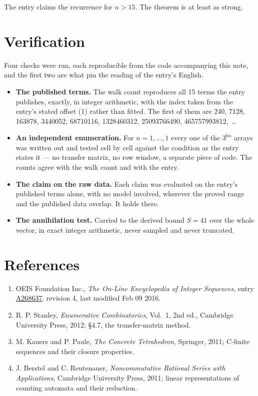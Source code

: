 \documentclass[11pt]{article}
\theoremstyle{definition}
\begin{document}
The entry claims the recurrence for $n > 15$. The theorem is at least as strong.

\section{Verification}

Four checks were run, each reproducible from the code accompanying this note, and the first two are what pin the reading of the entry's English.

\begin{itemize}

\item {\bfseries The published terms.} The walk count reproduces all 15 terms the entry publishes, exactly, in integer arithmetic, with the index taken from the entry's stated offset (1) rather than fitted. The first of them are 240, 7128, 163878, 3440052, 68710116, 1328460312, 25093766490, 465757993812,~\dots

\item {\bfseries An independent enumeration.} For $n = 1,\dots,1$ every one of the $3^{6n}$ arrays was written out and tested cell by cell against the condition as the entry states it --- no transfer matrix, no row window, a separate piece of code. The counts agree with the walk count and with the entry.

\item {\bfseries The claim on the raw data.} Each claim was evaluated on the entry's published terms alone, with no model involved, wherever the proved range and the published data overlap. It holds there.

\item {\bfseries The annihilation test.} Carried to the derived bound $S = 41$ over the whole vector, in exact integer arithmetic, never sampled and never truncated.

\end{itemize}

\section{References}

\begin{enumerate}

\item OEIS Foundation Inc., \emph{The On-Line Encyclopedia of Integer Sequences}, entry \href{https://oeis.org/A268637}{A268637}, revision 4, last modified Feb 09 2016.

\item R. P. Stanley, \emph{Enumerative Combinatorics}, Vol.~1, 2nd ed., Cambridge University Press, 2012; \S4.7, the transfer-matrix method.

\item M. Kauers and P. Paule, \emph{The Concrete Tetrahedron}, Springer, 2011; C-finite sequences and their closure properties.

\item J. Berstel and C. Reutenauer, \emph{Noncommutative Rational Series with Applications}, Cambridge University Press, 2011; linear representations of counting automata and their reduction.

\end{enumerate}
\end{document}
